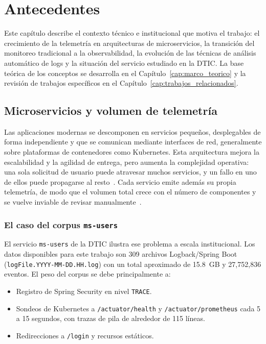 \chapter{Antecedentes} \label{cap:antecedentes}

Este capítulo describe el contexto técnico e institucional que motiva el trabajo: el crecimiento de la telemetría en arquitecturas de microservicios, la transición del monitoreo tradicional a la observabilidad, la evolución de las técnicas de análisis automático de logs y la situación del servicio estudiado en la DTIC. La base teórica de los conceptos se desarrolla en el Capítulo~\ref{cap:marco_teorico} y la revisión de trabajos específicos en el Capítulo~\ref{cap:trabajos_relacionados}.

\section{Microservicios y volumen de telemetría}\label{sec:ant_microservicios}

Las aplicaciones modernas se descomponen en servicios pequeños, desplegables de forma independiente y que se comunican mediante interfaces de red, generalmente sobre plataformas de contenedores como Kubernetes. Esta arquitectura mejora la escalabilidad y la agilidad de entrega, pero aumenta la complejidad operativa: una sola solicitud de usuario puede atravesar muchos servicios, y un fallo en uno de ellos puede propagarse al resto~\cite{wang2024_rca, uddin2026_microservice_logs}. Cada servicio emite además su propia telemetría, de modo que el volumen total crece con el número de componentes y se vuelve inviable de revisar manualmente~\cite{he2021_survey, uddin2026_microservice_logs}.

\subsection{El caso del corpus \texttt{ms-users}}\label{subsec:ant_corpus}

El servicio \texttt{ms-users} de la DTIC ilustra ese problema a escala institucional. Los datos disponibles para este trabajo son 309 archivos Logback/Spring Boot (\texttt{logFile.YYYY-MM-DD.HH.log}) con un total aproximado de 15.8~GB y 27{,}752{,}836 eventos. El peso del corpus se debe principalmente a:

\begin{itemize}
  \item Registro de Spring Security en nivel \texttt{TRACE}.
  \item Sondeos de Kubernetes a \texttt{/actuator/health} y \texttt{/actuator/prometheus} cada 5 a 15 segundos, con trazas de pila de alrededor de 115 líneas.
  \item Redirecciones a \texttt{/login} y recursos estáticos.
\end{itemize}

